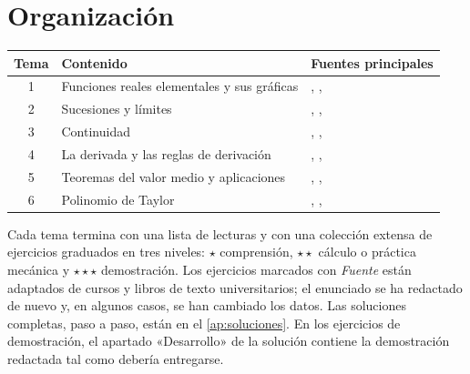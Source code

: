 \documentclass[11pt,a4paper,twoside,openany]{book}
\begin{document}
\section*{Organización}
\begin{center}
\begin{tabular}{@{}cll@{}}
\toprule
Tema & Contenido & Fuentes principales \\
\midrule
1 & Funciones reales elementales y sus gráficas & \cite{stewart}, \cite{osc1}, \cite{spivak} \\
2 & Sucesiones y límites & \cite{spivak}, \cite{cambA1}, \cite{osc1} \\
3 & Continuidad & \cite{spivak}, \cite{apostol}, \cite{cambA1} \\
4 & La derivada y las reglas de derivación & \cite{stewart}, \cite{mit1801}, \cite{spivak} \\
5 & Teoremas del valor medio y aplicaciones & \cite{spivak}, \cite{mit1801}, \cite{osc1} \\
6 & Polinomio de Taylor & \cite{spivak}, \cite{apostol}, \cite{mit1801} \\
\bottomrule
\end{tabular}
\end{center}

Cada tema termina con una lista de lecturas y con una colección extensa de ejercicios graduados en tres niveles: $\star$ comprensión, $\star\star$ cálculo o práctica mecánica y $\star\star\star$ demostración. Los ejercicios marcados con \emph{Fuente} están adaptados de cursos y libros de texto universitarios; el enunciado se ha redactado de nuevo y, en algunos casos, se han cambiado los datos. Las soluciones completas, paso a paso, están en el \cref{ap:soluciones}. En los ejercicios de demostración, el apartado «Desarrollo» de la solución contiene la demostración redactada tal como debería entregarse.
\end{document}
